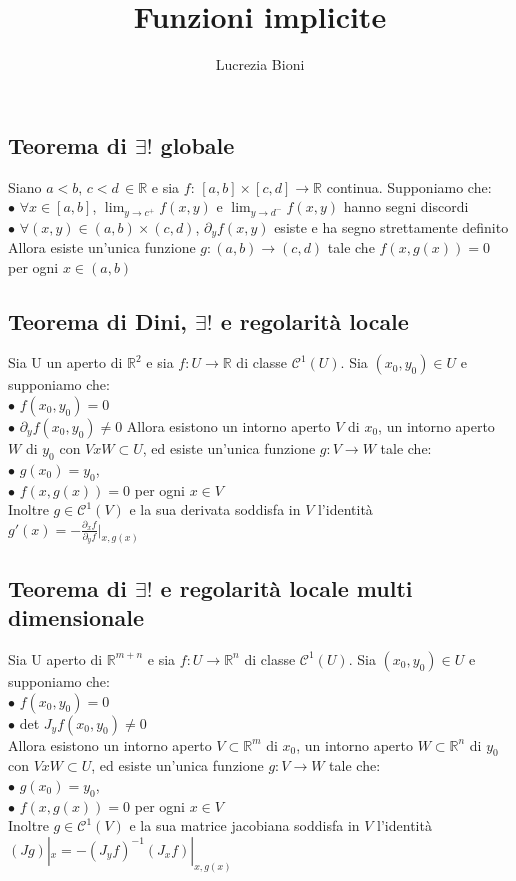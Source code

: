 \documentclass{article} %
\title{Funzioni implicite} %
\author{Lucrezia Bioni} %
\date{} %
\begin{document}
    \maketitle

    \subsection*{Teorema di $\exists !$ globale}
    Siano $a<b, \, c<d \, \in \mathbb{R}$ e sia $f: \, [a,b] \times [c,d] \to \mathbb{R}$ continua. Supponiamo che: \\
    $\bullet$ $\forall x \in [a,b]$, $\lim_{y \to c^+} f(x,y)$ e $\lim_{y \to d^-} f(x,y)$ hanno segni discordi \\
    $\bullet$ $\forall (x,y) \in (a,b) \times (c,d)$, $\partial_yf(x,y)$ esiste e ha segno strettamente definito \\
    Allora esiste un'unica funzione $g:(a,b) \to (c,d)$ tale che $f(x , g(x))=0$ per ogni $x \in (a,b)$


    \subsection*{Teorema di Dini, $\exists !$ e regolarità locale}
    Sia U un aperto di $\mathbb{R}^2$ e sia $f:U \to \mathbb{R}$ di classe $\mathcal{C}^1\left(U\right)$. Sia $(x_0,y_0)\in U$ e supponiamo che: \\
    $\bullet$ $f(x_0,y_0)=0$ \\
    $\bullet$ $\partial_y f(x_0,y_0) \neq 0$
    Allora esistono un intorno aperto $V$ di $x_0$, un intorno aperto $W$ di $y_0$ con $V x W \subset U$, ed esiste un'unica funzione $g: V \to W$ tale che: \\
    $\bullet$ $g(x_0)=y_0$, \\
    $\bullet$ $f(x,g(x))=0$ per ogni $x \in V$ \\
    Inoltre $g \in \mathcal{C}^1(V)$ e la sua derivata soddisfa in $V$ l'identità \\
    $g'(x) = - \frac{\partial_x f}{\partial_y f}|_{x,g(x)}$ 
    
    \subsection*{Teorema di $\exists !$ e regolarità locale multi dimensionale}
    Sia U aperto di $\mathbb{R}^{m+n}$ e sia $f:U \to \mathbb{R}^n$ di classe $\mathcal{C}^1\left(U\right)$. Sia $(x_0,y_0) \in U$ e supponiamo che: \\
    $\bullet$ $f(x_0,y_0)=0$ \\
    $\bullet$ det $J_{y}f(x_0,y_0) \neq 0$ \\
    Allora esistono un intorno aperto $V \subset \mathbb{R}^m$ di $x_0$, un intorno aperto $W \subset \mathbb{R}^n$ di $y_0$ con $V x W \subset U$, ed esiste un'unica funzione $g: V \to W$ tale che: \\
    $\bullet$ $g(x_0)=y_0$, \\
    $\bullet$ $f(x,g(x))=0$ per ogni $x \in V$ \\
    Inoltre $g \in \mathcal{C}^1(V)$ e la sua matrice jacobiana soddisfa in $V$ l'identità \\
    $(Jg)|_x = -(J_yf)^{-1}(J_xf)|_{x,g(x)}$ 
    
\end{document}
